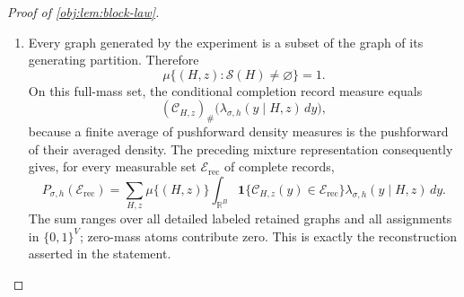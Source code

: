 \documentclass[11pt]{article}
\begin{document}
\begin{proof}[Proof of \cref{obj:lem:block-law}]
\begin{enumerate}
For the partition associated with \(g\), split the source-sign sum into revealed and hidden labels:
\[
\sum_{j\in S'_\ell}(2z_j-1)
=A_\ell+2k_\ell(g)-u_\ell.
\]
Since \(|S'_\ell|=d\), its response shift reduces to
\[
\delta_\ell(S',z)
=\frac{\sigma h}{2d}
\bigl(A_\ell+2k_\ell(g)-u_\ell\bigr).
\]
Thus its product response density depends on the completion through \(k(g)\). Regrouping the uniform completion average by these fibers gives
\[
\lambda_{\sigma,h}(y\mid H,z)
=
\frac1{\binom{M}{K}}
\sum_{\substack{0\le k_\ell\le u_\ell\\
\sum_{\ell=1}^{B}k_\ell=K}}
\prod_{\ell=1}^{B}
\binom{u_\ell}{k_\ell}
f\!\left(
y_\ell-\frac{\sigma h(A_\ell+2k_\ell-u_\ell)}{2d}
\right).
\]
Each translated product density integrates to one, and the fiber weights sum to one because the fibers partition \(\mathcal G(H)\). Hence this is a probability density.

Let \(x\) be a polynomial indeterminate, and let \([x^K]\) denote extraction of its degree-\(K\) coefficient. Expanding the finite product selects exactly the vectors whose coordinates sum to \(K\), so
\[
\lambda_{\sigma,h}(y\mid H,z)
=
\frac{
[x^K]\displaystyle\prod_{\ell=1}^{B}
\left\{
\sum_{k=0}^{u_\ell}
\binom{u_\ell}{k}
f\!\left(y_\ell-\frac{\sigma h(A_\ell+2k-u_\ell)}{2d}\right)x^k
\right\}
}{
\binom{M}{K}
}.
\]
This proves the stated density by averaging the translated baseline densities over the original labeled completions. %

\item Every graph generated by the experiment is a subset of the graph of its generating partition. Therefore
\[
\mu\{(H,z):\mathcal S(H)\ne\varnothing\}=1.
\]
On this full-mass set, the conditional completion record measure equals
\[
(\mathcal C_{H,z})_{\#}
\bigl(\lambda_{\sigma,h}(y\mid H,z)\,dy\bigr),
\]
because a finite average of pushforward density measures is the pushforward of their averaged density. The preceding mixture representation consequently gives, for every measurable set \(\mathcal E_{\mathrm{rec}}\) of complete records,
\[
P_{\sigma,h}(\mathcal E_{\mathrm{rec}})
=
\sum_{H,z}\mu\{(H,z)\}
\int_{\mathbb R^B}
\mathbf1\{\mathcal C_{H,z}(y)\in\mathcal E_{\mathrm{rec}}\}
\lambda_{\sigma,h}(y\mid H,z)\,dy.
\]
The sum ranges over all detailed labeled retained graphs and all assignments in \(\{0,1\}^{V}\); zero-mass atoms contribute zero. This is exactly the reconstruction asserted in the statement. %


\end{enumerate}
\end{proof}
\end{document}
